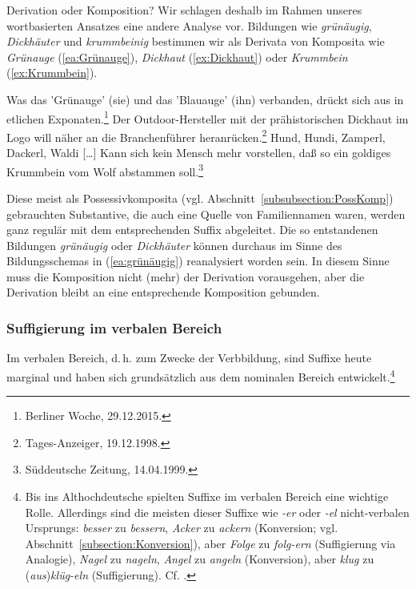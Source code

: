 \begin{Exkurs}{Derivation oder Komposition?}
Wir schlagen deshalb im Rahmen unseres wortbasierten Ansatzes eine andere Analyse vor. Bildungen wie \textit{grünäugig}, \textit{Dickhäuter} und \textit{krummbeinig} bestimmen wir als Derivata von Komposita wie \textit{Grünauge} (\ref{ea:Grünauge}), \textit{Dickhaut} (\ref{ex:Dickhaut}) oder \textit{Krummbein} (\ref{ex:Krummbein}).

\ea \label{ea:KompositaAdjSubst}
\ea \label{ea:Grünauge} Was das 'Grünauge' (sie) und das 'Blauauge' (ihn) verbanden, drückt sich aus in etlichen Exponaten.\footnote{Berliner Woche, 29.12.2015.}
\ex \label{ex:Dickhaut} Der Outdoor-Hersteller mit der prähistorischen Dickhaut im Logo will näher an die Branchenführer heranrücken.\footnote{Tages-Anzeiger, 19.12.1998.}
\ex \label{ex:Krummbein} Hund, Hundi, Zamperl, Dackerl, Waldi [\ldots{}] Kann sich kein Mensch mehr vorstellen, daß so ein goldiges Krummbein vom Wolf abstammen soll.\footnote{Süddeutsche Zeitung, 14.04.1999.}
\z 
\z 

Diese meist als Possessivkomposita (vgl. Abschnitt~\ref{subsubsection:PossKomp}) gebrauchten Substantive, die auch eine Quelle von Familiennamen waren, werden ganz regulär mit dem entsprechenden Suffix abgeleitet. Die so entstandenen Bildungen \textit{grünäugig} oder \textit{Dickhäuter} können durchaus im Sinne des Bildungsschemas in (\ref{ea:grünäugig}) reanalysiert worden sein. In diesem Sinne muss die Komposition nicht (mehr) der Derivation vorausgehen, aber die Derivation bleibt an eine entsprechende Komposition gebunden.

\end{Exkurs}


\subsubsection{Suffigierung im verbalen Bereich}\label{subsubsection:SuffigierungVerb}

Im verbalen Bereich, d.\,h. zum Zwecke der Verbbildung, sind Suffixe heute marginal und haben sich grundsätzlich aus dem nominalen Bereich entwickelt.\footnote{Bis ins Althochdeutsche spielten Suffixe im verbalen Bereich eine wichtige Rolle. Allerdings sind die meisten dieser Suffixe wie \textit{-er} oder \textit{-el} nicht-verbalen Ursprungs: \textit{besser} zu \textit{bessern}, \textit{Acker} zu \textit{ackern} (Konversion; vgl. Abschnitt~\ref{subsection:Konversion}), aber \textit{Folge} zu \textit{folg-ern} (Suffigierung via Analogie), \textit{Nagel} zu \textit{nageln}, \textit{Angel} zu \textit{angeln} (Konversion), aber \textit{klug} zu (\textit{aus})\textit{klüg-eln} (Suffigierung). Cf. \citet[91--101]{Wilmanns1896Wb}.}

